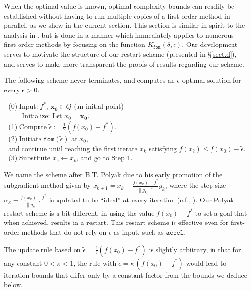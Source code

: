 \documentclass[reqno, 11pt]{amsart}
\numberwithin{equation}{section}
\newcommand{\fom}{\mathtt{fom}}
\newcommand{\accel}{\mathtt{accel}}
\begin{document}
When the optimal value is known, optimal complexity bounds can readily be established without having to run multiple copies of a first order method in parallel, as we show in the current section. This section is similar in spirit  to the analysis in \cite[\S4]{roulet2017sharpness}, but is done in a manner which immediately applies to numerous first-order methods by focusing on the function $ K_{\fom}(\delta, \epsilon) $. Our development serves to motivate the structure of our restart scheme (presented in \S\ref{sect.d}), and serves to make more transparent the proofs of results regarding our scheme.

The following scheme never terminates, and computes an $ \epsilon $-optimal solution for every $ \epsilon > 0 $. 
\vspace{2mm}

 
\noindent 
$ \textrm{~} $  \\ 
$ \textrm{~} $ \qquad (0) Input: $ f^* $, $ \mathbf{x_0}    \in Q $ (an initial point) \\
$ \textrm{~} $ \qquad \, \, \, \, Initialize: Let $ x_0 = \mathbf{x_0}  $. \\
$ \textrm{~} $  \qquad   (1) Compute  $ \tilde{\epsilon} := \frac{1}{2}( f( x_0) - f^* ) $. \\
$ \textrm{~} $ \qquad    (2) Initiate $ \fom( \tilde{\epsilon}) $ at $ x_0  $, \\
$ \textrm{~} $ \qquad \qquad \quad  and continue until reaching the first iterate $ x_k $ satisfying $ f(x_k) \leq f(x_0)-\tilde{\epsilon} $. \\
$ \textrm{~} $ \qquad    (3) Substitute $ x_0 \leftarrow x_k $, and go to Step 1.  
\vspace{2mm}

We name the scheme after B.T. Polyak due to his early promotion of the subgradient method given by $ x_{k+1} = x_k - \frac{f(x_k) - f^*}{ \| g_k \|^2} g_k $, where the step size $ \alpha_k =\frac{f(x_k) - f^*}{ \| g_k \|^2} $ is updated to be ``ideal'' at every iteration (c.f., \cite{polyak1987introduction}). Our Polyak restart scheme is a bit different, in using the value $ f(x_0) - f^* $ to set a goal that when achieved, results in a restart.  This restart scheme is effective even for first-order methods that do not rely on $ \epsilon $ as input, such as $ \accel $.

The update rule based on $ \tilde{\epsilon} = \frac{1}{2}( f( x_0) - f^* ) $ is slightly arbitrary, in that for any constant $ 0 < \kappa < 1 $, the rule with $ \tilde{\epsilon} = \kappa \, ( f( x_0) - f^* ) $ would lead to iteration bounds that differ only by a constant factor from the bounds we deduce below.
\end{document}
